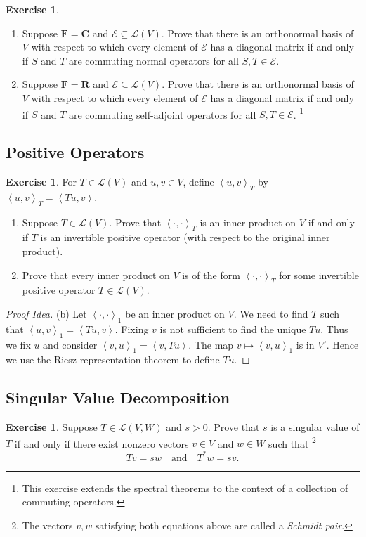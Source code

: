 \documentclass[nofonts,colorlinks]{tufte-handout}
\theoremstyle{plain} %
\theoremstyle{definition}
\newtheorem{exer}[thm]{Exercise}
\theoremstyle{remark}
\newcommand{\inp}[2]{\mathopen{}\left\langle#1,#2\right\rangle}
\newcommand{\R}{\mathbf{R}}
\newcommand{\C}{\mathbf{C}}
\newcommand{\F}{\mathbf{F}}
\renewcommand{\L}{\mathcal{L}}
\newcommand{\E}{\mathcal{E}}
\begin{document}
\begin{exer}
	\begin{enumerate}
		\item Suppose $\F=\C$ and $\E\subseteq\L(V)$. Prove that there is an orthonormal basis of $V$ with respect to which every element of $\E$ has a diagonal matrix if and only if $S$ and $T$ are commuting normal operators for all $S,T\in\E$.
		\item Suppose $\F=\R$ and $\E\subseteq\L(V)$. Prove that there is an orthonormal basis of $V$ with respect to which every element of $\E$ has a diagonal matrix if and only if $S$ and $T$ are commuting self-adjoint operators for all $S,T\in\E$.%
		\footnote{This exercise extends the spectral theorems to the context of a collection of commuting operators.}
	\end{enumerate}
\end{exer}


\subsection{Positive Operators}
\begin{exer}
	For $T\in\L(V)$ and $u,v\in V$, define $\inp{u}{v}_T$ by $\inp{u}{v}_T=\inp{Tu}{v}$.
	\begin{enumerate}
		\item Suppose $T\in\L(V)$. Prove that $\inp{\cdot}{\cdot}_T$ is an inner product on $V$ if and only if $T$ is an invertible positive operator (with respect to the original inner product).
		\item Prove that every inner product on $V$ is of the form $\inp{\cdot}{\cdot}_T$ for some invertible positive operator $T\in\L(V)$.
	\end{enumerate}
\end{exer}
\begin{proof}[Proof Idea]
	(b) Let $\inp{\cdot}{\cdot}_1$ be an inner product on $V$. We need to find $T$ such that $\inp{u}{v}_1=\inp{Tu}{v}$. Fixing $v$ is not sufficient to find the unique $Tu$. Thus we fix $u$ and consider $\inp{v}{u}_1=\inp{v}{Tu}$. The map $v\mapsto\inp{v}{u}_1$ is in $V'$. Hence we use the Riesz representation theorem to define $Tu$.
\end{proof}


\subsection{Singular Value Decomposition}
\begin{exer}
	Suppose $T\in\L(V,W)$ and $s>0$. Prove that $s$ is a singular value of $T$ if and only if there exist nonzero vectors $v\in V$ and $w\in W$ such that%
	\footnote{The vectors $v,w$ satisfying both equations above are called a \emph{Schmidt pair}.}
	\[Tv=sw\quad\text{and}\quad T^*w=sv.\]
\end{exer}
\end{document}
